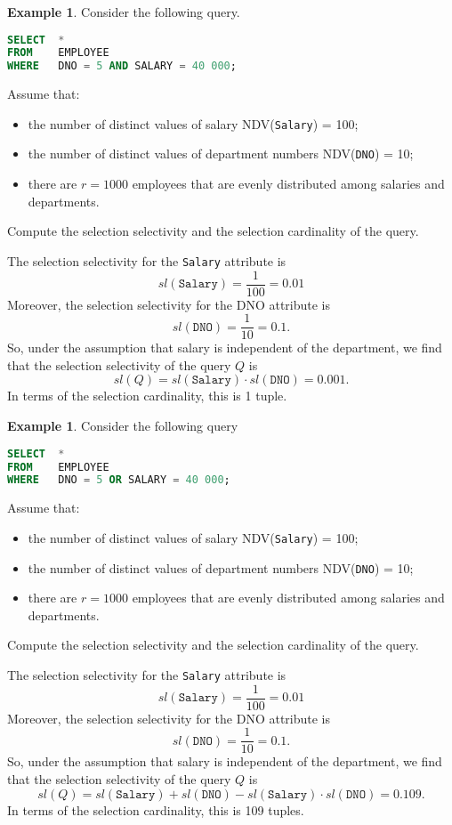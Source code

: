 \documentclass[a4paper, openany]{memoir}
\theoremstyle{definition}
\newtheorem{example}[subsection]{Example}
\begin{document}
\begin{example}
    Consider the following query.
\begin{lstlisting}[language=SQL]
SELECT  * 
FROM    EMPLOYEE
WHERE   DNO = 5 AND SALARY = 40 000;
\end{lstlisting}
    Assume that:
    \begin{itemize}
        \item the number of distinct values of salary NDV(\texttt{Salary}) = 100;
        \item the number of distinct values of department numbers NDV(\texttt{DNO}) = 10;
        \item there are $r = 1000$ employees that are evenly distributed among salaries and departments.
    \end{itemize}
    Compute the selection selectivity and the selection cardinality of the query.
\end{example}
\begin{answer}
    The selection selectivity for the \texttt{Salary} attribute is
    \[\textit{sl}(\texttt{Salary}) = \frac{1}{100} = 0.01\]
    Moreover, the selection selectivity for the DNO attribute is
    \[\textit{sl}(\texttt{DNO}) = \frac{1}{10} = 0.1.\]
    So, under the assumption that salary is independent of the department, we find that the selection selectivity of the query $Q$ is
    \[\textit{sl}(Q) = \textit{sl}(\texttt{Salary}) \cdot \textit{sl}(\texttt{DNO}) = 0.001.\]
    In terms of the selection cardinality, this is 1 tuple.
\end{answer}
\newpage

\begin{example}
    Consider the following query
\begin{lstlisting}[language=SQL]
SELECT  * 
FROM    EMPLOYEE
WHERE   DNO = 5 OR SALARY = 40 000;
\end{lstlisting}
Assume that:
\begin{itemize}
    \item the number of distinct values of salary NDV(\texttt{Salary}) = 100;
    \item the number of distinct values of department numbers NDV(\texttt{DNO}) = 10;
    \item there are $r = 1000$ employees that are evenly distributed among salaries and departments.
\end{itemize}
Compute the selection selectivity and the selection cardinality of the query.    
\end{example}
\begin{answer}
    The selection selectivity for the \texttt{Salary} attribute is
    \[\textit{sl}(\texttt{Salary}) = \frac{1}{100} = 0.01\]
    Moreover, the selection selectivity for the DNO attribute is
    \[\textit{sl}(\texttt{DNO}) = \frac{1}{10} = 0.1.\]
    So, under the assumption that salary is independent of the department, we find that the selection selectivity of the query $Q$ is
    \[\textit{sl}(Q) = \textit{sl}(\texttt{Salary}) + \textit{sl}(\texttt{DNO}) - \textit{sl}(\texttt{Salary}) \cdot \textit{sl}(\texttt{DNO}) = 0.109.\]
    In terms of the selection cardinality, this is 109 tuples.
\end{answer}
\newpage
\end{document}
